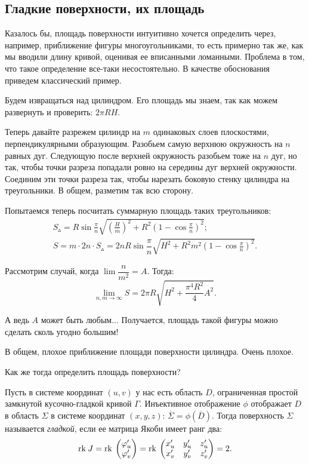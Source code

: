 \subsection{Гладкие поверхности, их площадь}
Казалось бы, площадь поверхности интуитивно хочется определить через, например, приближение фигуры многоугольниками, то есть примерно так же, как мы вводили длину кривой, оценивая ее вписанными ломанными. Проблема в том, что такое определение все-таки несостоятельно. В качестве обоснования приведем классический пример.

\begin{Examples}
Будем извращаться над цилиндром. Его площадь мы знаем, так как можем развернуть и проверить: $2\pi R H$.

Теперь давайте разрежем цилиндр на $m$ одинаковых слоев плоскостями, перпендикулярными образующим. Разобьем самую верхнюю окружность на $n$ равных дуг. Следующую после верхней окружность разобьем тоже на $n$ дуг, но так, чтобы точки
разреза попадали ровно на середины дуг верхней окружности. Соединим эти точки разреза так, чтобы нарезать боковую стенку цилиндра на треугольники. В общем, разметим так всю сторону.

Попытаемся теперь посчитать суммарную площадь таких треугольников:
\begin{gather*}
S_\vartriangle = R \sin \frac{\pi}{n} \sqrt{\left( \frac{H}{m} \right)^2 + R^2 \left( 1 - \cos \frac{\pi}{n} \right)^2};\\
S =  m \cdot 2n \cdot S_\vartriangle = 2n R \sin \dfrac{\pi}{n}\sqrt{H^2 + R^2m^2 \left( 1 - \cos \frac{\pi}{n} \right)^2}.
\end{gather*}

Рассмотрим случай, когда $\lim \dfrac{n}{m^2} = A$. Тогда:
$$
\lim\limits_{n, m \to \infty} S = 2\pi R \sqrt{H^2 + \dfrac{\pi^4 R^2}{4}A^2}.
$$

А ведь $A$ может быть любым... Получается, площадь такой фигуры можно сделать сколь угодно большим!

В общем, плохое приближение площади поверхности цилиндра. Очень плохое.
\end{Examples}

Как же тогда определить площадь поверхности?

\begin{Def}
Пусть в системе координат $(u, v)$ у нас есть область $D$, ограниченная простой замкнутой кусочно-гладкой кривой $\Gamma$. Инъективное отображение $\phi$ отображает $D$ в область $\Sigma$ в системе координат $(x, y, z)$: $\overline\Sigma = \phi(\overline D)$. Тогда поверхность $\Sigma$ называется \textit{гладкой}, если ее матрица Якоби имеет ранг два:
$$
\mathrm{rk}\: J = \mathrm{rk}\: \begin{pmatrix}
\varphi'_u \\ \varphi'_v
\end{pmatrix} = \mathrm{rk}\: \begin{pmatrix}
x'_u & y'_u & z'_u \\
x'_v & y'_v & z'_v
\end{pmatrix} = 2.
$$
\end{Def}

